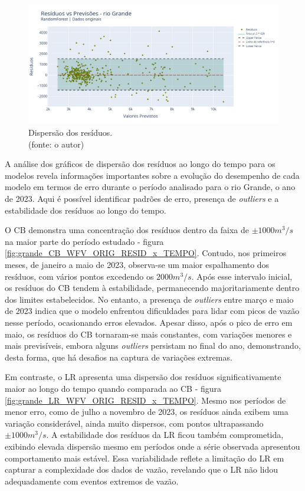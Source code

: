 \begin{figure}[!h]
\centering
\includegraphics[scale=0.33]{Figuras/rio_grande/wfv/RF/RF_WFV_ORIG_RESID_x_PREV.png}
\caption{Dispersão dos resíduos.\\(fonte: o autor)}
\label{fig:grande_RF_WFV_ORIG_RESID_x_PREV}
\end{figure}
\clearpage

A análise dos gráficos de dispersão dos resíduos ao longo do tempo para os modelos revela informações importantes sobre a evolução do desempenho de cada modelo em termos de erro durante o período analisado para o rio Grande, o ano de 2023. Aqui é possível identificar padrões de erro, presença de \textit{outliers} e a estabilidade dos resíduos ao longo do tempo.

O CB demonstra uma concentração dos resíduos dentro da faixa de $\pm 1000 m^3/s$ na maior parte do período estudado - figura \ref{fig:grande_CB_WFV_ORIG_RESID_x_TEMPO}. Contudo, nos primeiros meses, de janeiro a maio de 2023, observa-se um maior espalhamento dos resíduos, com vários pontos excedendo os $2000 m^3/s$. Após esse intervalo inicial, os resíduos do CB tendem à estabilidade, permanecendo majoritariamente dentro dos limites estabelecidos. No entanto, a presença de \textit{outliers} entre março e maio de 2023 indica que o modelo enfrentou dificuldades para lidar com picos de vazão nesse período, ocasionando erros elevados. Apesar disso, após o pico de erro em maio, os resíduos do CB tornaram-se mais constantes, com variações menores e mais previsíveis, embora alguns \textit{outliers} persistam no final do ano, demonstrando, desta forma, que há desafios na captura de variações extremas.

Em contraste, o LR apresenta uma dispersão dos resíduos significativamente maior ao longo do tempo quando comparada ao CB - figura \ref{fig:grande_LR_WFV_ORIG_RESID_x_TEMPO}. Mesmo nos períodos de menor erro, como de julho a novembro de 2023, os resíduos ainda exibem uma variação considerável, ainda muito dispersos, com pontos ultrapassando $\pm 1000 m^3/s$. A estabilidade dos resíduos da LR ficou também comprometida, exibindo elevada dispersão mesmo em períodos onde a série observada apresentou comportamento mais estável. Essa variabilidade reflete a limitação do LR em capturar a complexidade dos dados de vazão, revelando que o LR não lidou adequadamente com eventos extremos de vazão.

